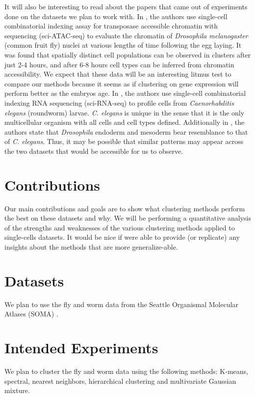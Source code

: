 \documentclass{article}
\begin{document}
It will also be interesting to read about the papers that came out of experiments done on the datasets we plan to work with. In \cite{b2}, the authors use single-cell combinatorial indexing assay for transposase accessible chromatin with sequencing (sci-ATAC-seq) to evaluate the chromatin of \textit{Drosophila melanogaster} (common fruit fly) nuclei at various lengths of time following the egg laying. It was found that spatially distinct cell populations can be observed in clusters after just 2-4 hours, and after 6-8 hours cell types can be inferred from chromatin accessibility. We expect that these data will be an interesting litmus test to compare our methods because it seems as if clustering on gene expression will perform better as the embryos age. In \cite{b3}, the authors use single-cell combinatorial indexing RNA sequencing (sci-RNA-seq) to profile cells from \textit{Caenorhabditis elegans} (roundworm) larvae. \textit{C. elegans} is unique in the sense that it is the only multicellular organism with all cells and cell types defined. Additionally in \cite{b2}, the authors state that \textit{Drosophila} endoderm and mesoderm bear resemblance to that of \textit{C. elegans}. Thus, it may be possible that similar patterns may appear across the two datasets that would be accessible for us to observe.

\section{Contributions}

Our main contributions and goals are to show what clustering methods perform the best on these datasets and why. We will be performing a quantitative analysis of the strengths and weaknesses of the various clustering methods applied to single-cells datasets. It would be nice if were able to provide (or replicate) any insights about the methods that are more generalize-able.

\section{Datasets}

We plan to use the fly and worm data from the Seattle Organismal Molecular Atlases (SOMA) \cite{b1}.

\section{Intended Experiments}
We plan to cluster the fly and worm data using the following methods: K-means, spectral, nearest neighbors, hierarchical clustering and multivariate Gaussian mixture.
\end{document}
